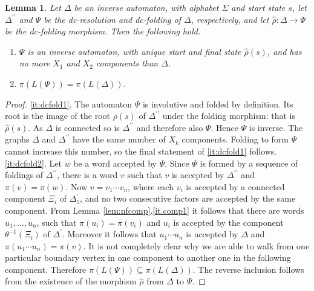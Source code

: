 \documentclass[a4paper,12pt]{article}
\newcommand{\D}{\Delta }
\renewcommand{\L}{\Lambda }
\renewcommand{\S}{\Sigma }
\newtheorem{lemma}[theorem]{Lemma}
\numberwithin{equation}{section}
\numberwithin{figure}{section}
\newcommand{\maps}{\rightarrow}
\newcommand{\be}{\begin{enumerate}}
\newcommand{\ee}{\end{enumerate}}
\begin{document}
\begin{lemma}\label{lem:dcfold}
Let $\D$ be  an inverse automaton, with alphabet $\S$ and start
state $s$, let $\D^{\prime\prime}$  and $\Psi$ be the
dc-resolution and dc-folding of $\D$, respectively, and 
let $\hat\rho:\D\maps \Psi$ be the dc-folding morphism. 
 Then the following hold. 
\be 
\item
\label{it:dcfold1} $\Psi$ is an inverse automaton, with unique
start and  final state $\hat\rho(s)$, and has no more $X_1$ and
$X_2$ components than $\D$. 
\item \label{it:dcfold2}
$\pi(L(\Psi))=\pi(L(\D))$. 
\ee
\end{lemma}
\begin{proof}
\ref{it:dcfold1}.
The automaton $\Psi$ is involutive and folded by definition.
 Its root is the image of the root $\rho(s)$ of $\D^{\prime\prime}$ under
 the folding morphism: that is $\hat\rho(s)$.
 As
$\D$ is connected  so is $\D^{\prime\prime}$ and therefore also
$\Psi$. Hence $\Psi$ is inverse. The graphs $\D$ and
$\D^{\prime\prime}$  have the same number of $X_k$ components.
Folding to form $\Psi$ cannot increase this number, so the final
statement of \ref{it:dcfold1} follows.
 \\[1em]
\ref{it:dcfold2}. Let $w$ be a word accepted by $\Psi$. Since
$\Psi$ is formed by a sequence of foldings of $\D^{\prime\prime}$,
there is a word $v$ such that $v$ is accepted by
$\D^{\prime\prime}$ and $\pi(v)=\pi(w)$. Now $v=v_1\cdots v_n$,
where each $v_i$ is accepted by a connected component $\Xi_i$ of
$\D^\prime_5$, and no two consecutive factors are accepted by the
same component. From Lemma \ref{lem:nfcomp}.\ref{it.comp1} it
follows that there are words $u_1,\ldots , u_n$, such that
$\pi(u_i)=\pi(v_i)$ and $u_i$ is accepted by the component
$\theta^{-1}(\Xi_i)$ of $\D^\prime$. Moreover it follows that
$u_1\cdots u_n$ is accepted by $\D$ and $\pi(u_1\cdots
u_n)=\pi(v)$. {\ef It is not completely clear why we are able to
walk from one particular boundary vertex in one component to
another one in the following component.} Therefore
$\pi(L(\Psi))\subseteq \pi(L(\D))$. The reverse inclusion follows
from the existence of the morphism $\hat\rho$ from $\D$ to $\Psi$.

\end{proof}
\end{document}
